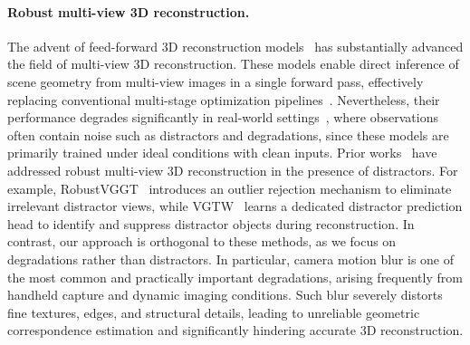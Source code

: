 \documentclass{llmxive}
\begin{document}
\paragraph{Robust multi-view 3D reconstruction.}
The advent of feed-forward 3D reconstruction models~\cite{wang2024dust3r, leroy2024grounding, wang2025vggt, wang2025pi, depthanything3} has substantially advanced the field of multi-view 3D reconstruction. These models enable direct inference of scene geometry from multi-view images in a single forward pass, effectively replacing conventional multi-stage optimization pipelines~\cite{hartley2003multiple, schonberger2016structure, Schonberger_2016_CVPR, furukawa2010towards, furukawa2015mvs, DeTone_2018_CVPR_Workshops, an2024cross, 4587673, Sun_2021_CVPR}. Nevertheless, their performance degrades significantly in real-world settings~\cite{nah2017deep, rim2020real, malyugina2025unsupervised, liu2024boosting, han2025emergent}, where observations often contain noise such as distractors and degradations, since these models are primarily trained under ideal conditions with clean inputs. Prior works~\cite{han2025emergent, panvisual} have addressed robust multi-view 3D reconstruction in the presence of distractors. For example, RobustVGGT~\cite{han2025emergent} introduces an outlier rejection mechanism to eliminate irrelevant distractor views, while VGTW~\cite{panvisual} learns a dedicated distractor prediction head to identify and suppress distractor objects during reconstruction. In contrast, our approach is orthogonal to these methods, as we focus on degradations rather than distractors. In particular, camera motion blur is one of the most common and practically important degradations, arising frequently from handheld capture and dynamic imaging conditions. Such blur severely distorts fine textures, edges, and structural details, leading to unreliable geometric correspondence estimation and significantly hindering accurate 3D reconstruction.

\end{document}
